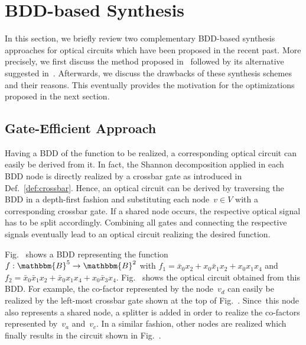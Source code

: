 \documentclass[10pt,letterpaper,twoside,openright]{book}
\begin{document}
\section{BDD-based Synthesis}\label{sec:bdd-synthesis}

In this section, we briefly review two complementary BDD-based synthesis approaches for optical circuits which have been proposed in the recent past. More precisely, we first discuss the method proposed in~\cite{Condrat2011} followed by its alternative suggested in~\cite{WKHD:2015}. Afterwards, we discuss the drawbacks of these synthesis schemes and their reasons. This eventually provides the motivation for the optimizations proposed in the next section.

\subsection{Gate-Efficient Approach}\label{sec:direct-bdd}

Having a BDD of the function to be realized, a corresponding optical circuit
can easily be derived from it. 
In fact, the Shannon decomposition applied in each BDD node is directly
realized by a crossbar gate as introduced in Def.~\ref{def:crossbar}.
Hence, an optical circuit can be derived by traversing the BDD in a depth-first fashion
and substituting each node~$v\in V$ with a corresponding crossbar gate. 
If a shared node occurs, the respective optical signal has to be split accordingly.
Combining all gates and connecting the respective signals eventually lead to an optical
circuit realizing the desired function.

\begin{example}\label{example:bdd_synth}
Fig.~ shows a BDD representing the
function~$f:\mathbbm{B}^5\rightarrow\mathbbm{B}^2$ with \mbox{$f_1=\bar{x}_0x_2+x_0\bar{x}_1x_2+x_0x_1x_4$} and
\mbox{$f_2=\bar{x}_0\bar{x}_1x_2+\bar{x}_0x_1x_4+x_0\bar{x}_3x_4$}.
Fig.~ shows the optical circuit obtained from this BDD.
For example, the co-factor represented by the node~$v_d$ can easily be realized by the left-most
crossbar gate shown at the top of Fig.~.
Since~this node also represents a shared node, a splitter is added in order to realize the
co-factors represented by~$v_a$ and~$v_c$. In a similar fashion, other nodes are realized which
finally results in the circuit shown in Fig.~.
\end{example}
\end{document}
